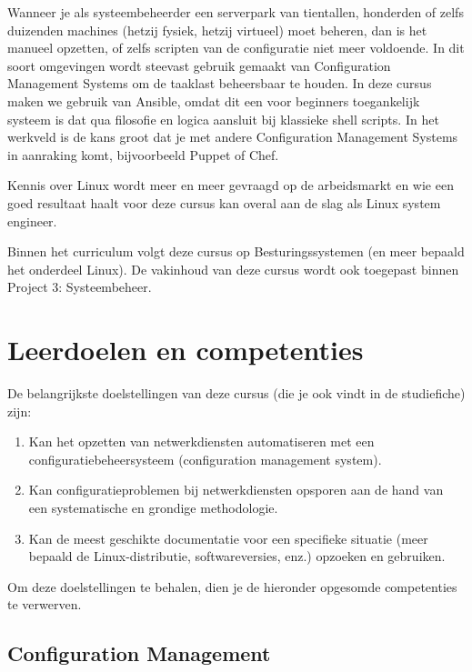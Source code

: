 Wanneer je als systeembeheerder een serverpark van tientallen, honderden of zelfs duizenden machines (hetzij fysiek, hetzij virtueel) moet beheren, dan is het manueel opzetten, of zelfs scripten van de configuratie niet meer voldoende. In dit soort omgevingen wordt steevast gebruik gemaakt van Configuration Management Systems om de taaklast beheersbaar te houden. In deze cursus maken we gebruik van Ansible, omdat dit een voor beginners toegankelijk systeem is dat qua filosofie en logica aansluit bij klassieke shell scripts. In het werkveld is de kans groot dat je met andere Configuration Management Systems in aanraking komt, bijvoorbeeld Puppet of Chef.

Kennis over Linux wordt meer en meer gevraagd op de arbeidsmarkt en wie een goed resultaat haalt voor deze cursus kan overal aan de slag als Linux system engineer.

Binnen het curriculum volgt deze cursus op Besturingssystemen (en meer bepaald het onderdeel Linux). De vakinhoud van deze cursus wordt ook toegepast binnen Project 3: Systeembeheer.

\section{Leerdoelen en competenties}%
\label{sec:leerdoelen}

De belangrijkste doelstellingen van deze cursus (die je ook vindt in de studiefiche) zijn:

\begin{enumerate}
  \item Kan het opzetten van netwerkdiensten automatiseren met een configuratiebeheersysteem (configuration management system).
  \item Kan configuratieproblemen bij netwerkdiensten opsporen aan de hand van een systematische en grondige methodologie.
  \item Kan de meest geschikte documentatie voor een specifieke situatie (meer bepaald de Linux-distributie, softwareversies, enz.) opzoeken en gebruiken.
\end{enumerate}

Om deze doelstellingen te behalen, dien je de hieronder opgesomde competenties te verwerven.

\subsection{Configuration Management}%
\label{ssec:config-mgmt}

